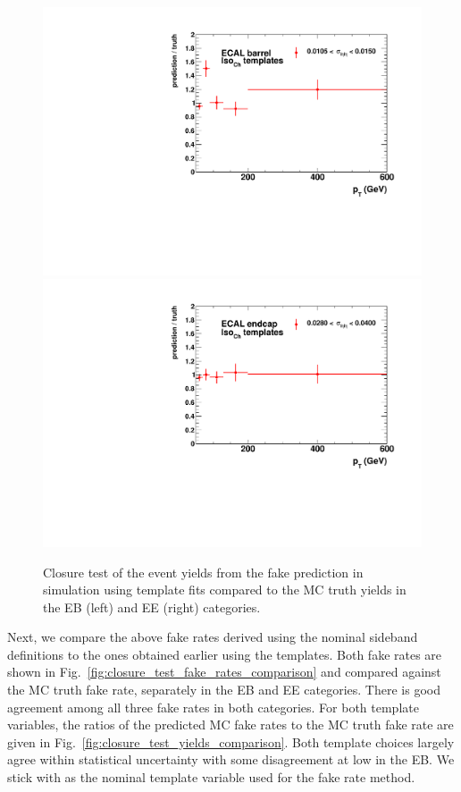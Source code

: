 \begin{figure}[!htbp]
  \centering
  \includegraphics[scale=0.40]{figures/closure_test_fake_rate_ratio_chIso_EB.pdf}
  \includegraphics[scale=0.40]{figures/closure_test_fake_rate_ratio_chIso_EE.pdf}
  \caption{Closure test of the event yields from the fake prediction in simulation using \chiso template fits compared to the MC truth yields in the EB (left) and EE (right) categories.}
  \label{fig:closure_test_yields_chiso}
\end{figure}

Next, we compare the above fake rates derived using the nominal sideband definitions to the ones obtained earlier using the \sieie templates. Both fake rates are shown in Fig.~\ref{fig:closure_test_fake_rates_comparison} and compared against the MC truth fake rate, separately in the EB and EE categories. There is good agreement among all three fake rates in both categories. For both template variables, the ratios of the predicted MC fake rates to the MC truth fake rate are given in Fig.~\ref{fig:closure_test_yields_comparison}. Both template choices largely agree within statistical uncertainty with some disagreement at low \pt in the EB. We stick with \sieie as the nominal template variable used for the fake rate method.

